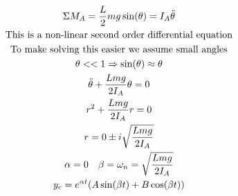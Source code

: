\documentclass[11pt, a4paper]{article}
\begin{document}
\begin{gather}
  \Sigma M_A = \frac{L}{2}mg\sin(\theta) = I_A\ddot{\theta}\\
  \text{This is a non-linear second order differential equation}\notag \\
  \text{To make solving this easier we assume small angles} \notag \\
  \theta << 1 \Rightarrow \sin(\theta) \approx \theta\\
  \ddot{\theta} + \frac{Lmg}{2I_A} \theta = 0\\
  r^2 +  \frac{Lmg}{2I_A} r = 0\\
  r = 0 \pm i\sqrt{\frac{Lmg}{2I_A}}\\
  \alpha = 0 \quad \beta = \omega_n = \sqrt{\frac{Lmg}{2I_A}}\\
  y_c = e^{\alpha t}(A\sin(\beta t) + B\cos(\beta t))
\end{gather}
\end{document}
